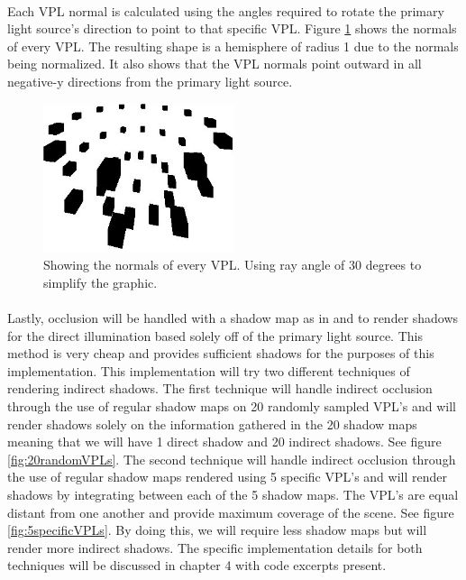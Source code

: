 \paragraph{}
Each VPL normal is calculated using the angles required to rotate the primary light source's direction to point to that specific VPL.  Figure \ref{fig:vplNormals} shows the normals of every VPL.  The resulting shape is a hemisphere of radius 1 due to the normals being normalized.  It also shows that the VPL normals point outward in all negative-y directions from the primary light source.

\begin{figure}[h!]
  \centering
    \includegraphics[width=0.5\textwidth]{vplNormals.jpg}
  	\caption{Showing the normals of every VPL. Using ray angle of 30 degrees to simplify the graphic.}
	\label{fig:vplNormals}
\end{figure}

\paragraph{}
Lastly, occlusion will be handled with a shadow map as in \cite{Williams1978} and \cite{Reeves1987} to render shadows for the direct illumination based solely off of the primary light source.  This method is very cheap and provides sufficient shadows for the purposes of this implementation.  This implementation will try two different techniques of rendering indirect shadows.  The first technique will handle indirect occlusion through the use of regular shadow maps on 20 randomly sampled VPL's and will render shadows solely on the information gathered in the 20 shadow maps meaning that we will have 1 direct shadow and 20 indirect shadows.  See figure \ref{fig:20randomVPLs}.  The second technique will handle indirect occlusion through the use of regular shadow maps rendered using 5 specific VPL's and will render shadows by integrating between each of the 5 shadow maps.  The VPL's are equal distant from one another and provide maximum coverage of the scene.  See figure \ref{fig:5specificVPLs}.  By doing this, we will require less shadow maps but will render more indirect shadows.  The specific implementation details for both techniques will be discussed in chapter 4 with code excerpts present.

